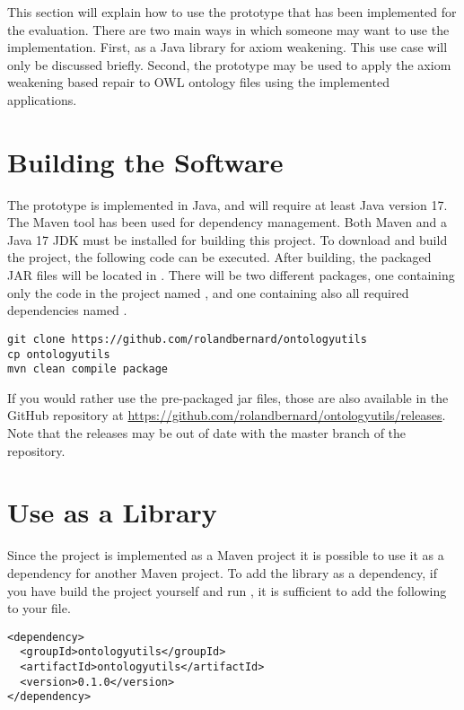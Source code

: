 
This section will explain how to use the prototype that has been implemented for the evaluation. There are two main ways in which someone may want to use the implementation. First, as a Java library for axiom weakening. This use case will only be discussed briefly. Second, the prototype may be used to apply the axiom weakening based repair to OWL ontology files using the implemented applications.

\section{Building the Software}

The prototype is implemented in Java, and will require at least Java version 17. The Maven tool has been used for dependency management. Both Maven and a Java 17 JDK must be installed for building this project. To download and build the project, the following code can be executed. After building, the packaged JAR files will be located in . There will be two different packages, one containing only the code in the project named , and one containing also all required dependencies named .

\begin{lstlisting}
git clone https://github.com/rolandbernard/ontologyutils
cp ontologyutils
mvn clean compile package
\end{lstlisting}

If you would rather use the pre-packaged jar files, those are also available in the GitHub repository at \url{https://github.com/rolandbernard/ontologyutils/releases}. Note that the releases may be out of date with the master branch of the repository.

\section{Use as a Library}

Since the project is implemented as a Maven project it is possible to use it as a dependency for another Maven project. To add the library as a dependency, if you have build the project yourself and run , it is sufficient to add the following to your  file. 

\begin{lstlisting}
<dependency>
  <groupId>ontologyutils</groupId>
  <artifactId>ontologyutils</artifactId>
  <version>0.1.0</version>
</dependency>
\end{lstlisting}

